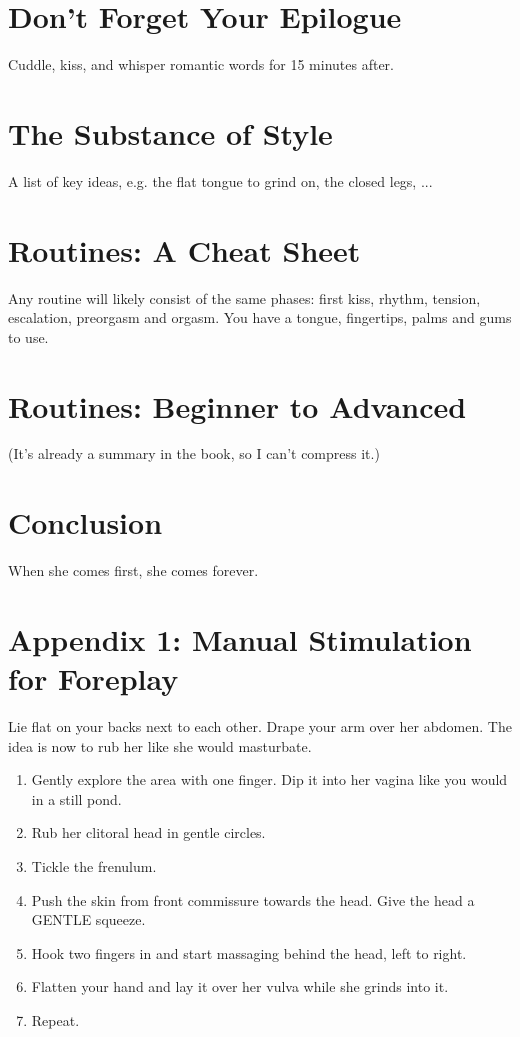 \section{Don't Forget Your Epilogue}
Cuddle, kiss, and whisper romantic words for 15 minutes after.

\section{The Substance of Style}
A list of key ideas, e.g. the flat tongue to grind on, the closed legs, ...

\section{Routines: A Cheat Sheet}
\begin{outline}
\1 Any routine will likely consist of the same phases: first kiss, rhythm, tension, escalation, preorgasm and orgasm.
\1 You have a tongue, fingertips, palms and gums to use.
\end{outline}

\section{Routines: Beginner to Advanced}
(It's already a summary in the book, so I can't compress it.)

\section*{Conclusion}
When she comes first, she comes forever.

\section*{Appendix 1: Manual Stimulation for Foreplay}
Lie flat on your backs next to each other. Drape your arm over her abdomen. The idea is now to rub her like she would masturbate.
\begin{enumerate}
	\item Gently explore the area with one finger. Dip it into her vagina like you would in a still pond.
	\item Rub her clitoral head in gentle circles.
	\item Tickle the frenulum.
	\item Push the skin from front commissure towards the head. Give the head a GENTLE squeeze.
	\item Hook two fingers in and start massaging behind the head, left to right.
	\item Flatten your hand and lay it over her vulva while she grinds into it.
	\item Repeat. 
\end{enumerate}
